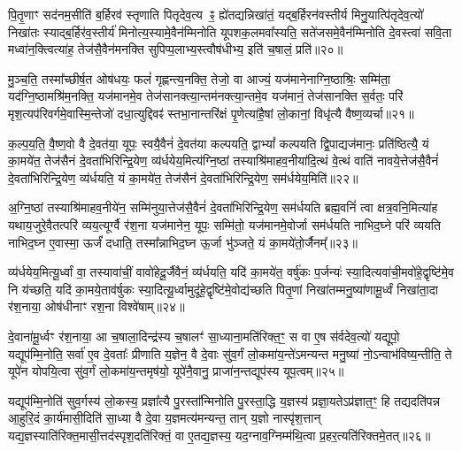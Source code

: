 पि॒तृ॒णाꣳ सद॑नम॒सीति॑ ब॒र्\mbox{}हिरव॑ स्तृणाति पितृदेव॒त्य ꣴ॒ ह्ये॑तद्यन्निखा॑तं॒ यद्ब॒र्\mbox{}हिरन॑वस्तीर्य मिनु॒यात्पि॑तृदेव॒त्यो॑ निखा॑तः स्याद्ब॒र्\mbox{}हिर॑व॒स्तीर्य॑ मिनोत्य॒स्यामे॒वैन॑म्मिनोति यूपशक॒लमवा᳚स्यति॒ सते॑जसमे॒वैन॑म्मिनोति दे॒वस्त्वा॑ सवि॒ता मध्वा॑न॒क्त्वित्या॑ह॒ तेज॑सै॒वैन॑मनक्ति सुपिप्प॒लाभ्य॒स्त्वौष॑धीभ्य॒ इति॑ च॒षालं॒ प्रति॑॥२०॥

मु॒ञ्च॒ति॒ तस्मा᳚च्छीर्\mbox{}ष॒त ओष॑धयः॒ फलं॑ गृह्णन्त्य॒नक्ति॒ तेजो॒ वा आज्यं॒ यज॑मानेनाग्नि॒ष्ठाश्रिः॒ सम्मि॑ता॒ यद॑ग्नि॒ष्ठा\-मश्रि॑म॒नक्ति॒ यज॑मानमे॒व तेज॑सानक्त्या॒न्तम॑नक्त्या॒न्तमे॒व यज॑मानं॒ तेज॑सानक्ति स॒र्वतः॒ परि॑ मृश॒त्यप॑रिवर्गमे॒वा\-स्मि॒न्तेजो॑ दधा॒त्युद्दिवꣴ॑ स्तभा॒नान्तरि॑क्षं पृ॒णेत्या॑है॒षां लो॒कानां॒ विधृ॑त्यै वैष्ण॒व्यर्चा॥२१॥

क॒ल्प॒य॒ति॒ वै॒ष्ण॒वो वै दे॒वत॑या॒ यूपः॒ स्वयै॒वैनं॑ दे॒वत॑या कल्पयति॒ द्वा\-भ्यां᳚ कल्पयति द्वि॒पाद्यज॑मानः॒ प्रति॑ष्ठित्यै॒ यं का॒मये॑त॒ तेज॑सैनं दे॒वता॑भिरिन्द्रि॒येण॒ व्य॑र्धयेय॒मित्य॑ग्नि॒ष्ठां तस्याश्रि॑माहव॒नीया॑दि॒त्थं वे॒त्थं वाति॑ नावये॒त्तेज॑सै॒वैनं॑ दे॒वता॑भिरिन्द्रि॒येण॒ व्य॑र्धयति॒ यं का॒मये॑त॒ तेज॑सैनं दे॒वता॑भिरिन्द्रि॒येण॒ सम॑र्धयेय॒मिति॑॥२२॥

अ॒ग्नि॒ष्ठां तस्याश्रि॑माहव॒नीये॑न॒ सम्मि॑नुया॒त्तेज॑सै॒वैनं॑ दे॒वता॑भिरिन्द्रि॒येण॒ सम॑र्धयति ब्रह्म॒वनिं॑ त्वा क्षत्र॒वनि॒मित्या॑ह यथाय॒जुरे॒वैतत्परि॑ व्यय॒त्यूर्ग्वै र॑श॒ना यज॑मानेन॒ यूपः॒ सम्मि॑तो॒ यज॑मानमे॒वोर्जा सम॑र्धयति नाभिद॒घ्ने परि॑ व्ययति नाभिद॒घ्न ए॒वास्मा॒ ऊर्जं॑ दधाति॒ तस्मा᳚न्नाभिद॒घ्न ऊ॒र्जा भु॑ञ्जते॒ यं का॒मये॑तो॒र्जैनम्᳚॥२३॥

व्य॑र्धयेय॒मित्यू॒र्ध्वां वा॒ तस्यावा॑चीं॒ वावो॑हेदू॒र्जैवैनं॒ व्य॑र्धयति॒ यदि॑ का॒मये॑त॒ वर्\mbox{}षु॑कः प॒र्जन्यः॑ स्या॒दित्यवा॑ची॒मवो॑हे॒\-द्वृष्टि॑मे॒व नि य॑च्छति॒ यदि॑ का॒मये॒ताव॑र्\mbox{}षुकः स्या॒दित्यू॒र्ध्वामुदू॑हे॒द्वृष्टि॑मे॒वोद्य॑च्छति पितृ॒णां निखा॑तम्मनु॒ष्या॑णामू॒र्ध्वं निखा॑ता॒दा र॑श॒नाया॒ ओष॑धीनाꣳ रश॒ना विश्वे॑षाम्॥२४॥

दे॒वाना॑मू॒र्ध्वꣳ र॑श॒नाया॒ आ च॒षाला॒दिन्द्र॑स्य च॒षालꣳ॑ सा॒ध्याना॒मति॑रिक्त॒ꣳ॒ स वा ए॒ष स॑र्वदेव॒त्यो॑ यद्यूपो॒ यद्यूप॑\-म्मि॒नोति॒ सर्वा॑ ए॒व दे॒वताः᳚ प्रीणाति य॒ज्ञेन॒ वै दे॒वाः सु॑व॒र्गं लो॒कमा॑य॒न्ते॑\-ऽमन्यन्त मनु॒ष्या॑ नो॒\-ऽन्वाभ॑विष्य॒न्तीति॒ ते यूपे॑न योपयि॒त्वा सु॑व॒र्गं लो॒कमा॑य॒न्तमृष॑यो॒ यूपे॑नै॒वानु॒ प्राजा॑न॒न्तद्यूप॑स्य यूप॒त्वम्॥२५॥

यद्यूप॑म्मि॒नोति॑ सुव॒र्गस्य॑ लो॒कस्य॒ प्रज्ञा᳚त्यै पु॒रस्ता᳚न्मिनोति पु॒रस्ता॒द्धि य॒ज्ञस्य॑ प्रज्ञा॒यते\-ऽप्र॑ज्ञात॒ꣳ॒ हि तद्यदति॑पन्न आ॒हुरि॒दं का॒र्य॑मासी॒दिति॑ सा॒ध्या वै दे॒वा य॒ज्ञमत्य॑मन्यन्त॒ तान् य॒ज्ञो नास्पृ॑श॒त्तान् यद्य॒ज्ञस्याति॑रिक्त॒मासी॒त्तद॑स्पृश॒\-दति॑रिक्तं॒ वा ए॒तद्य॒ज्ञस्य॒ यद॒ग्नाव॒ग्निम्म॑थि॒त्वा प्र॒हर॒त्यति॑रिक्तमे॒तत्॥२६॥

